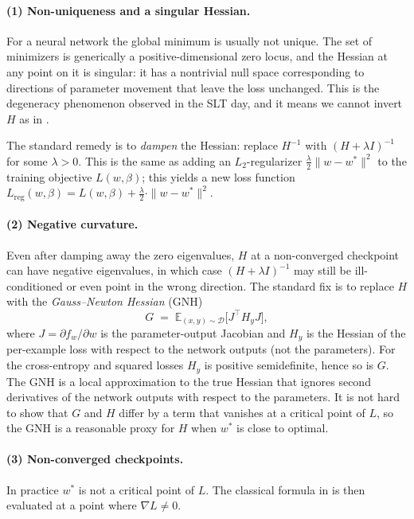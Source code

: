 \documentclass[11pt]{article}
\begin{document}
\paragraph{(1) Non-uniqueness and a singular Hessian.} For a neural network the global minimum is usually not unique. The set of minimizers is generically a positive-dimensional zero locus, and the Hessian at any point on it is singular: it has a nontrivial null space corresponding to directions of parameter movement that leave the loss unchanged. This is the degeneracy phenomenon observed in the SLT day, and it means we cannot invert $H$ as in .

The standard remedy is to \emph{dampen} the Hessian: replace $H^{-1}$ with $(H + \lambda I)^{-1}$ for some $\lambda > 0$. This is the same as adding an $L_2$-regularizer $\frac{\lambda}{2}\|w-w^*\|^2$ to the training objective $L(w,\beta)$; this yields a new loss function $L_{\mathrm{reg}}(w,\beta)= L(w,\beta)+\frac{\lambda}{2}\cdot \|w-w^*\|^2$.



\paragraph{(2) Negative curvature.} Even after damping away the zero eigenvalues, $H$ at a non-converged checkpoint can have negative eigenvalues, in which case $(H + \lambda I)^{-1}$ may still be ill-conditioned or even point in the wrong direction. The standard fix is to replace $H$ with the \emph{Gauss--Newton Hessian} (GNH)
\[
  G \;=\; \mathbb{E}_{(x,y)\sim\mathcal{D}}\bigl[J^\top H_y J\bigr],
\]
where $J = \partial f_w/\partial w$ is the parameter-output Jacobian and $H_y$ is the Hessian of the per-example loss with respect to the network outputs (not the parameters). For the cross-entropy and squared losses $H_y$ is positive semidefinite, hence so is $G$. The GNH is a local approximation to the true Hessian that ignores second derivatives of the network outputs with respect to the parameters. It is not hard to show that $G$ and $H$ differ by a term that vanishes at a critical point of $L$, so the GNH is a reasonable proxy for $H$ when $w^*$ is close to optimal.

\paragraph{(3) Non-converged checkpoints.} In practice $w^*$ is not a critical point of $L$. The classical formula in  is then evaluated at a point where $\nabla L \neq 0$.
\end{document}
